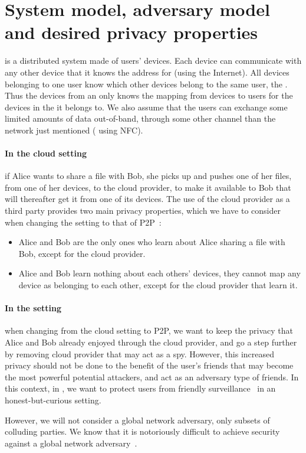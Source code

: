 \section{System model, adversary model and desired privacy properties}%
\label{system-model}

\name is a distributed system made of users' devices. 
Each device can communicate with any other device that it knows the
address for (\eg using the Internet). All devices belonging to one user
 know which other devices belong to the same user, \ie the \squad.
Thus the devices from an \squad only knows the mapping from devices to users for the devices in 
the \squad it belongs to.
We also assume that the users can exchange some limited amounts of data 
out-of-band, \ie through some other channel than the network just mentioned (\eg 
using \ac{NFC}).

\paragraph*{In the cloud setting} if Alice wants to share a file with
Bob, she picks up and pushes one of her files, from one of her devices, to the cloud
provider, to make it available to Bob that will thereafter get it from
one of its devices. The use of the cloud provider as a third party
provides two main privacy properties, which we have to consider when
changing the setting to that of \ac{P2P}~\cite{DevilInMetadata}:
\begin{itemize}
\item Alice and Bob are the only ones who learn 
about Alice sharing a file with Bob, except for the cloud provider.
\item Alice and Bob learn nothing about each others' devices, \ie 
they cannot map any device as belonging to each other, except for the
cloud provider that learn it.
\end{itemize} 

\paragraph*{In the \name setting} when changing from the cloud setting
to \ac{P2P}, we want to keep the privacy that Alice and Bob already
enjoyed through the cloud provider, and go a step further by removing 
cloud provider that may act as a spy. However, this increased privacy
should not be done to the benefit of the user's friends that may
become the most powerful potential attackers, and act
as an adversary type of friends.
In this context, in \name, we want to protect users from friendly
surveillance~\cite{FriendlySurveillance} in an honest-but-curious setting.

However, we will not consider a global network adversary, only subsets of colluding 
parties. We know that it is notoriously difficult to achieve security against a global 
network adversary~\cite{SystemsForAnonymousCommunication}.
